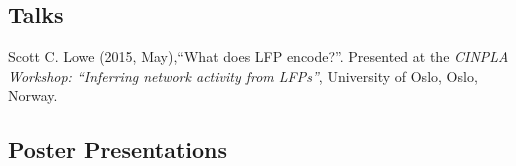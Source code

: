 \documentclass[11pt, a4paper]{article} %
\renewenvironment{itemize}{
  \begin{list}{}{
    \setlength{\leftmargin}{0em}
  }
}{
  \end{list}
}
\begin{document}
\subsection*{Talks}
%
\begin{itemize}
%
\item
Scott C. Lowe (2015, May),``What does LFP encode?''.
{Presented at the \emph{CINPLA Workshop: ``Inferring network activity from LFPs''}, University of Oslo, Oslo, Norway.}
%
\end{itemize}

%
%
\subsection*{Poster Presentations}
%
%
\end{document}

